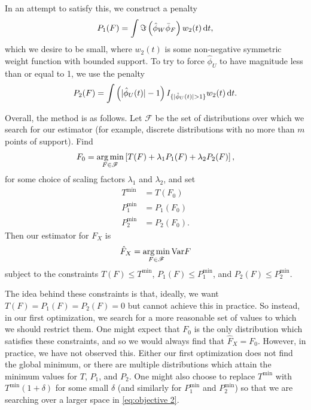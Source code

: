 	In an attempt to satisfy this, we construct a penalty
	\begin{align}
		P_1(F) = \int \Im \left(\hat{\phi}_W \bar{\phi}_F\right) w_2(t)\, \mathrm{d} t,
		\label{eq:penalty1}
	\end{align}
	which we desire to be small,
	where $w_2(t)$ is some non-negative symmetric weight function with bounded support.	To try to force $\hat{\phi}_U$ to have magnitude less than or equal to 1, we use the penalty
	\begin{align}
		P_2(F) = \int \left(|\hat{\phi}_U(t)| - 1\right) I_{\{|\hat{\phi}_U(t)| > 1\}}  w_2(t) \, \mathrm{d} t.
		\label{eq:penalty2}
	\end{align} 

	Overall, the method is as follows. Let $\mathscr{F}$ be the set of distributions over which we search for our estimator (for example, discrete distributions with no more than $m$ points of support). Find
	\begin{equation}
		F_0 = \operatorname*{arg\,min}_{F \in \mathscr{F}} \left[T(F) + \lambda_1 P_1(F) + \lambda_2 P_2(F)\right],
		\label{eq:objective 1}
	\end{equation}
	for some choice of scaling factors $\lambda_1$ and $\lambda_2$, and set
	\begin{align}
		T^\mathrm{min} &= T(F_0)\\
		P_1^\mathrm{min} &= P_1(F_0)\\
		P_2^\mathrm{min} &= P_2(F_0).
	\end{align}
	Then our estimator for $F_X$ is
	\begin{equation}
		\hat{F}_X = \operatorname*{arg\,min}_{F \in \mathscr{F}} \mathrm{Var}{F}
		\label{eq:objective 2}
	\end{equation}
	subject to the constraints $T(F) \leq T^\mathrm{min}$, $P_1(F) \leq P_1^\mathrm{min}$, and $P_2(F) \leq P_2^\mathrm{min}$.

	The idea behind these constraints is that, ideally, we want $T(F) = P_1(F) = P_2(F) = 0$ but cannot achieve this in practice. So instead, in our first optimization, we search for a more reasonable set of values to which we should restrict them. One might expect that $F_0$ is the only distribution which satisfies these constraints, and so we would always find that $\hat{F}_X = F_0$. However, in practice, we have not observed this. Either our first optimization does not find the global minimum, or there are multiple distributions which attain the minimum values for $T$, $P_1$, and $P_2$. One might also choose to replace $T^\mathrm{min}$ with $T^\mathrm{min}(1 + \delta)$ for some small $\delta$ (and similarly for $P_1^\mathrm{min}$ and $P_2^\mathrm{min}$) so that we are searching over a larger space in \eqref{eq:objective 2}.
	
